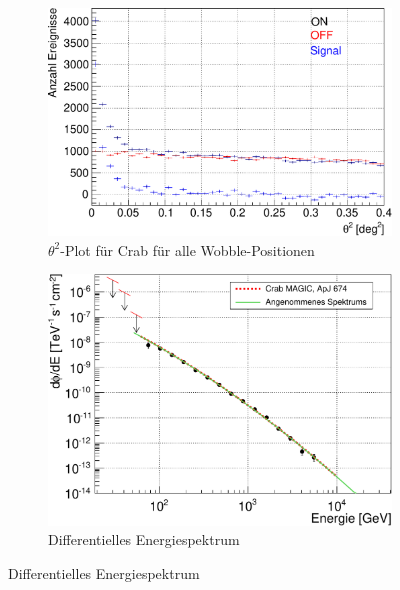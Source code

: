 \begin{figure}
  \begin{subfigure}{0.45\linewidth}
  \includegraphics[width=\textwidth]{./Plots/04_MrkAnalyse/Datenset2/Crab_Theta2.pdf}
  \caption{$\theta^2$-Plot für Crab für alle Wobble-Positionen}
  \label{Datenset2_theta^2_Crab}
  \end{subfigure}
  \hfill
  \begin{subfigure}{0.45\linewidth}
  \includegraphics[width=\textwidth]{./Plots/04_MrkAnalyse/Datenset2/Crab_dFdE.pdf}
  \caption{Differentielles Energiespektrum}
  \label{Datenset2_SpectralShape_Crab}

\end{subfigure}
\end{figure}
